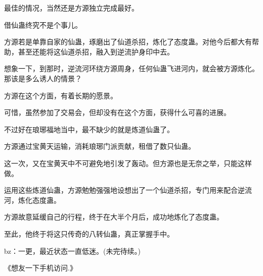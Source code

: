 \begin{this_body}
最佳的情况，当然还是方源独立完成最好。

借仙蛊终究不是个事儿。

方源若是单靠自家的仙蛊，琢磨出了仙道杀招，炼化了态度蛊。对他今后都大有帮助，甚至还能将这仙道杀招，融入到逆流护身印中去。

想象一下，到那时，逆流河环绕方源周身，任何仙蛊飞进河内，就会被方源炼化。那该是多么诱人的情景？

方源在这个方面，有着长期的愿景。

可惜，虽然参加了交易会，但却没有在这个方面，获得什么可喜的进展。

不过好在琅琊福地当中，最不缺少的就是炼道仙蛊了。

方源通过宝黄天运输，消耗琅琊门派贡献，租借了数只仙蛊。

这一次，又在宝黄天中不可避免地引发了轰动。但方源也是无奈之举，只能这样做。

运用这些炼道仙蛊，方源勉勉强强地设想出了一个仙道杀招，专门用来配合逆流河，炼化态度蛊。

方源故意延缓自己的行程，终于在大半个月后，成功地炼化了态度蛊。

至此，他终于将这只传奇的八转仙蛊，真正掌握手中。

bz：一更，最近状态一直低迷。(未完待续。)

《想友一下手机访问.》

\end{this_body}

